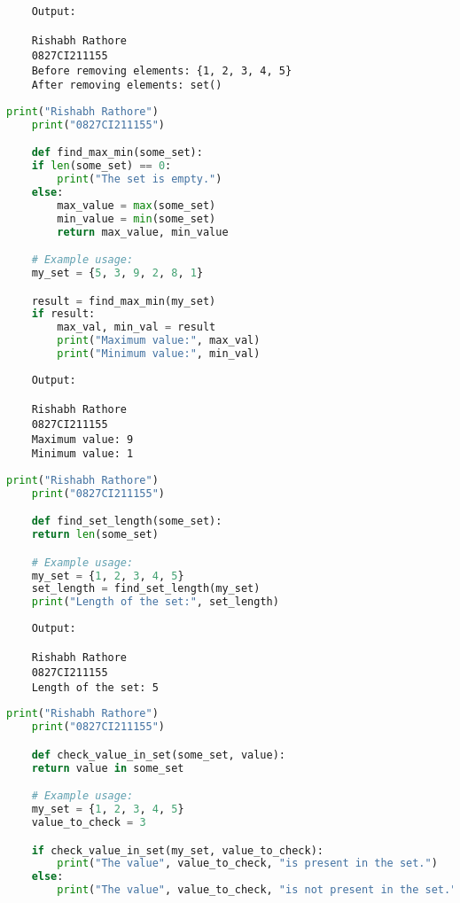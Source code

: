 \documentclass{report}
\begin{document}
\begin{verbatim}
	Output:

	Rishabh Rathore
	0827CI211155
	Before removing elements: {1, 2, 3, 4, 5}
	After removing elements: set()

\end{verbatim}


\newpage


\sol 
\begin{lstlisting}[language=Python]
	print("Rishabh Rathore")
	print("0827CI211155")

	def find_max_min(some_set):
    if len(some_set) == 0:
        print("The set is empty.")
    else:
        max_value = max(some_set)
        min_value = min(some_set)
        return max_value, min_value

	# Example usage:
	my_set = {5, 3, 9, 2, 8, 1}

	result = find_max_min(my_set)
	if result:
		max_val, min_val = result
		print("Maximum value:", max_val)
		print("Minimum value:", min_val)
\end{lstlisting}

\begin{verbatim}
	Output:

	Rishabh Rathore
	0827CI211155
	Maximum value: 9
	Minimum value: 1

\end{verbatim}


\newpage


\sol 
\begin{lstlisting}[language=Python]
	print("Rishabh Rathore")
	print("0827CI211155")

	def find_set_length(some_set):
    return len(some_set)

	# Example usage:
	my_set = {1, 2, 3, 4, 5}
	set_length = find_set_length(my_set)
	print("Length of the set:", set_length)
\end{lstlisting}

\begin{verbatim}
	Output:

	Rishabh Rathore
	0827CI211155
	Length of the set: 5

\end{verbatim}


\newpage


\sol 
\begin{lstlisting}[language=Python]
	print("Rishabh Rathore")
	print("0827CI211155")

	def check_value_in_set(some_set, value):
    return value in some_set

	# Example usage:
	my_set = {1, 2, 3, 4, 5}
	value_to_check = 3

	if check_value_in_set(my_set, value_to_check):
		print("The value", value_to_check, "is present in the set.")
	else:
		print("The value", value_to_check, "is not present in the set.")
\end{lstlisting}
\end{document}
